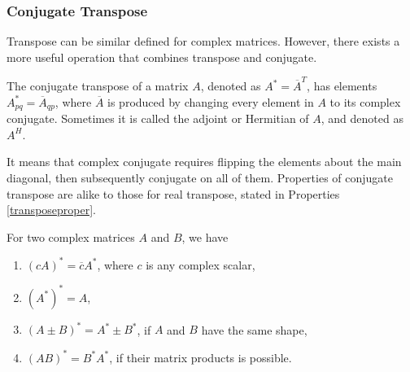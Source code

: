 \subsubsection{Conjugate Transpose}
Transpose can be similar defined for complex matrices. However, there exists a more useful operation that combines transpose and conjugate.
\begin{defn}
The conjugate transpose of a matrix $A$, denoted as $A^* = \overline{A}^T$, has elements $A^*_{pq} = \overline{A}_{qp}$, where $\overline{A}$ is produced by changing every element in $A$ to its complex conjugate. Sometimes it is called the adjoint or Hermitian of $A$, and denoted as $A^H$. 
\end{defn}
It means that complex conjugate requires flipping the elements about the main diagonal, then subsequently conjugate on all of them. Properties of conjugate transpose are alike to those for real transpose, stated in Properties \ref{transposeproper}.
\begin{proper}
For two complex matrices $A$ and $B$, we have
\begin{enumerate}
\item $(cA)^* = \overline{c}A^*$, where $c$ is any complex scalar,
\item $(A^*)^* = A$,
\item $(A \pm B)^* = A^* \pm B^*$, if $A$ and $B$ have the same shape,
\item $(AB)^* = B^*A^*$, if their matrix products is possible.
\end{enumerate}
\end{proper}

